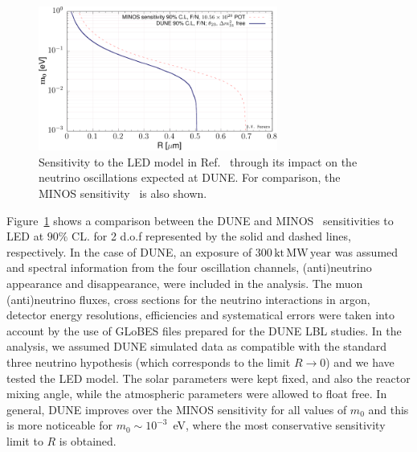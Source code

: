 \begin{figure}[ht]
\centerline{
\includegraphics[width=0.7\textwidth]{graphics/LED_sensitivity.pdf}
}
\caption[Sensitivity to the LED model in Ref.~\cite{Davoudiasl:2002fq}]{Sensitivity to the LED model in Ref.~\cite{Davoudiasl:2002fq} through its impact on the neutrino oscillations expected at 
DUNE. For comparison, the MINOS sensitivity~\cite{Adamson:2016yvy} is also shown.}
\label{fig:ledsensitivity}
\end{figure}

Figure~\ref{fig:ledsensitivity} shows a comparison between the DUNE and MINOS~\cite{Adamson:2016yvy} 
sensitivities to LED at $90\%$ CL. for 2 d.o.f represented by the solid and dashed lines, respectively. 
In the case of DUNE, an exposure of $300\,\text{kt}\,\text{MW}\,\text{year}$ 
was assumed and spectral information from the four oscillation channels, (anti)neutrino 
appearance and disappearance, were included in the analysis. The muon (anti)neutrino 
fluxes, cross sections for the neutrino interactions in argon, detector energy 
resolutions, efficiencies and systematical errors were taken into account by the use of 
GLoBES files prepared for the DUNE LBL studies. In the analysis, we assumed DUNE 
simulated data as compatible with the standard three neutrino hypothesis (which corresponds to the limit $R\to 0$) and we have 
tested the LED model. The solar parameters were kept fixed, and also the reactor mixing 
angle, while the atmospheric parameters were allowed to float free. In general, DUNE 
improves over the MINOS sensitivity for all values of $m_0$ and this is more noticeable 
for $m_0\sim 10^{-3}$~eV, where the most conservative sensitivity limit to $R$ is 
obtained. 

